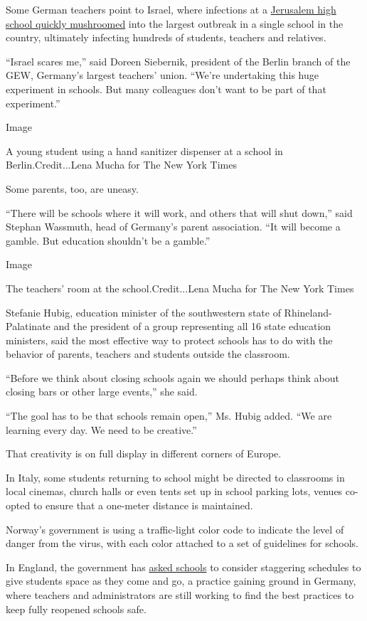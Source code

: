Some German teachers point to Israel, where infections at a
\href{https://www.nytimes3xbfgragh.onion/2020/08/04/world/middleeast/coronavirus-israel-schools-reopen.html}{Jerusalem
high school quickly mushroomed} into the largest outbreak in a single
school in the country, ultimately infecting hundreds of students,
teachers and relatives.

``Israel scares me,'' said Doreen Siebernik, president of the Berlin
branch of the GEW, Germany's largest teachers' union. ``We're
undertaking this huge experiment in schools. But many colleagues don't
want to be part of that experiment.''

Image

A young student using a hand sanitizer dispenser at a school in
Berlin.Credit...Lena Mucha for The New York Times

Some parents, too, are uneasy.

``There will be schools where it will work, and others that will shut
down,'' said Stephan Wassmuth, head of Germany's parent association.
``It will become a gamble. But education shouldn't be a gamble.''

Image

The teachers' room at the school.Credit...Lena Mucha for The New York
Times

Stefanie Hubig, education minister of the southwestern state of
Rhineland-Palatinate and the president of a group representing all 16
state education ministers, said the most effective way to protect
schools has to do with the behavior of parents, teachers and students
outside the classroom.

``Before we think about closing schools again we should perhaps think
about closing bars or other large events,'' she said.

``The goal has to be that schools remain open,'' Ms. Hubig added. ``We
are learning every day. We need to be creative.''

That creativity is on full display in different corners of Europe.

In Italy, some students returning to school might be directed to
classrooms in local cinemas, church halls or even tents set up in school
parking lots, venues co-opted to ensure that a one-meter distance is
maintained.

Norway's government is using a traffic-light color code to indicate the
level of danger from the virus, with each color attached to a set of
guidelines for schools.

In England, the government has
\href{https://www.gov.uk/government/publications/actions-for-schools-during-the-coronavirus-outbreak/guidance-for-full-opening-schools\#section-1-public-health-advice-to-minimise-coronavirus-covid-19-risks}{asked
schools} to consider staggering schedules to give students space as they
come and go, a practice gaining ground in Germany, where teachers and
administrators are still working to find the best practices to keep
fully reopened schools safe.

